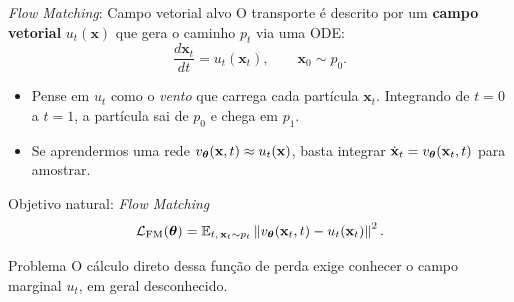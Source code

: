 \documentclass[aspectratio=169,xcolor=dvipsnames]{beamer}
\begin{document}
  \begin{frame}{\textit{Flow Matching}: Campo vetorial alvo}
    \small
    O transporte é descrito por um \textbf{campo vetorial} $u_t(\mathbf{x})$
    que gera o caminho $p_t$ via uma ODE:
    \vspace{0.1em}
    \[
      \frac{d \mathbf{x}_t}{dt} = u_t(\mathbf{x}_t),
      \qquad \mathbf{x}_0 \sim p_0.
    \]
    \vspace{0.1em}
    \begin{itemize}
      \item Pense em $u_t$ como o \emph{vento} que carrega cada partícula
      $\mathbf{x}_t$. Integrando de $t=0$ a $t=1$, a partícula sai de $p_0$ e
      chega em $p_1$.
      \item Se aprendermos uma rede
      $v_{\bm{\theta}}(\mathbf{x}, t) \approx u_t(\mathbf{x})$, basta integrar
      $\dot{\mathbf{x}}_t = v_{\bm{\theta}}(\mathbf{x}_t, t)$ para amostrar.
    \end{itemize}
    \begin{block}{Objetivo natural: \textit{Flow Matching}}
      \vspace{-0.4em}
      \[
        \mathcal{L}_{\text{FM}}(\bm{\theta}) =
        \mathbb{E}_{t,\, \mathbf{x}_t \sim p_t}
        \left\| v_{\bm{\theta}}(\mathbf{x}_t, t) - u_t(\mathbf{x}_t) \right\|^{2}.
      \]
    \end{block}
    \begin{alertblock}{Problema}
      O cálculo direto dessa função de perda exige conhecer o campo
      marginal $u_t$, em geral desconhecido.
    \end{alertblock}
  \end{frame}
\end{document}
